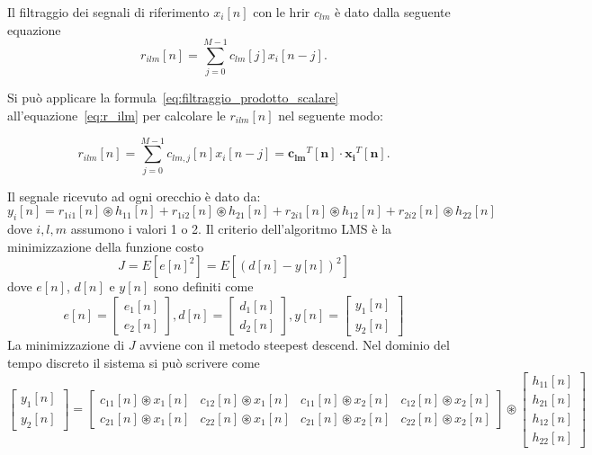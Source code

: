 \documentclass[12pt,a4paper,titlepage]{article}
\begin{document}
Il filtraggio dei segnali di riferimento $x_i[n]$ con le hrir $c_{lm}$ è dato dalla seguente equazione
\begin{equation}\label{eq:r_ilm}
r_{ilm}[n]=\sum_{j=0}^{M-1}c_{lm}[j]x_i[n-j].
\end{equation}

Si può applicare la formula~\eqref{eq:filtraggio_prodotto_scalare} all'equazione~\eqref{eq:r_ilm} per calcolare le $r_{ilm}[n]$ nel seguente modo:

\begin{equation}\label{eq:r_ilm_prodotto_scalare}
r_{ilm}[n]=\sum_{j=0}^{M-1}c_{lm,j}[n]x_i[n-j] = \mathbf{c_{lm}}^T[\mathbf{n}] \cdot \mathbf{x_i}^T[\mathbf{n}].
\end{equation}

Il segnale ricevuto ad ogni orecchio è dato da:
\begin{equation}\label{eq:y_i_lms}
y_i[n]=r_{1i1}[n] \circledast h_{11}[n]+r_{1i2}[n] \circledast h_{21}[n]+
r_{2i1}[n] \circledast h_{12}[n]+r_{2i2}[n] \circledast h_{22}[n]
\end{equation}
dove $i,l,m$ assumono i valori 1 o 2.
Il criterio dell'algoritmo LMS è la minimizzazione della funzione costo
\begin{equation}
J=E[e[n]^2]=E[(d[n]-y[n])^2]
\end{equation}
dove $e[n]$, $d[n]$ e $y[n]$ sono definiti come
\begin{equation}
e[n]=
\begin{bmatrix}
e_1[n]\\
e_2[n]
\end{bmatrix},
d[n]=
\begin{bmatrix}
d_1[n]\\
d_2[n]
\end{bmatrix},
y[n]=
\begin{bmatrix}
y_1[n]\\
y_2[n]
\end{bmatrix}
\end{equation}
La minimizzazione di $J$ avviene con il metodo steepest descend.
Nel dominio del tempo discreto il sistema si può scrivere come
\begin{equation}\label{eq:y_lms}
\begin{bmatrix}
	y_1[n]     \\
	y_2[n]    
\end{bmatrix}
= 
\begin{bmatrix}
	c_{11}[n] \circledast x_1[n]  &  c_{12}[n] \circledast x_1[n]  & c_{11}[n] \circledast x_2[n]  & c_{12}[n] \circledast x_2[n]    \\
	c_{21}[n] \circledast x_1[n]  &  c_{22}[n] \circledast x_1[n]  & c_{21}[n] \circledast x_2[n]  & c_{22}[n] \circledast x_2[n]     
\end{bmatrix} 
\circledast
\begin{bmatrix}
	h_{11}[n] \\
	h_{21}[n] \\
	h_{12}[n] \\
	h_{22}[n]  
\end{bmatrix}
\end{equation}
\end{document}
